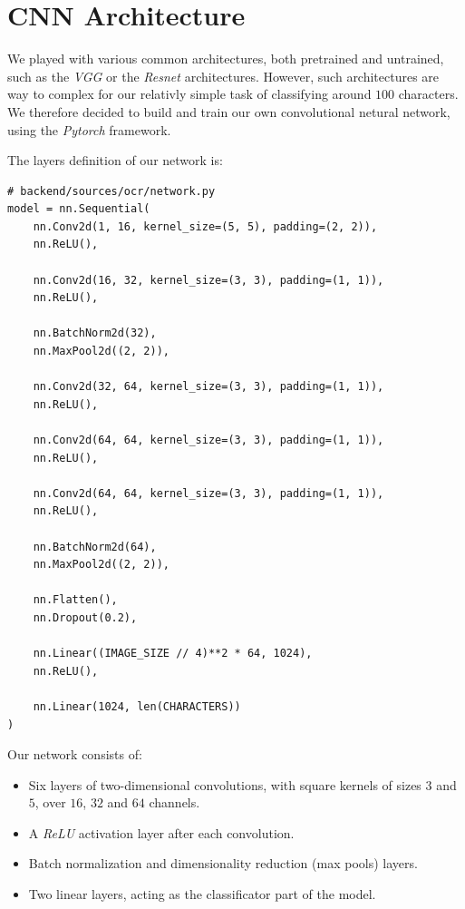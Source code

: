 \documentclass[11pt, a4paper]{report}
\begin{document}
\section{CNN Architecture}

We played with various common architectures, both pretrained and untrained, such as the \textit{VGG} \cite{VGG} or the \textit{Resnet} \cite{resnet} architectures.
However, such architectures are way to complex for our relativly simple task of classifying around $100$ characters. We therefore decided to build and train our own convolutional netural network, using the \textit{Pytorch} framework.

The layers definition of our network is:

\begin{verbatim}
# backend/sources/ocr/network.py
model = nn.Sequential(
    nn.Conv2d(1, 16, kernel_size=(5, 5), padding=(2, 2)),
    nn.ReLU(),
    
    nn.Conv2d(16, 32, kernel_size=(3, 3), padding=(1, 1)),
    nn.ReLU(),
    
    nn.BatchNorm2d(32),
    nn.MaxPool2d((2, 2)),
    
    nn.Conv2d(32, 64, kernel_size=(3, 3), padding=(1, 1)),
    nn.ReLU(),
    
    nn.Conv2d(64, 64, kernel_size=(3, 3), padding=(1, 1)),
    nn.ReLU(),
    
    nn.Conv2d(64, 64, kernel_size=(3, 3), padding=(1, 1)),
    nn.ReLU(),

    nn.BatchNorm2d(64),
    nn.MaxPool2d((2, 2)),

    nn.Flatten(),
    nn.Dropout(0.2),

    nn.Linear((IMAGE_SIZE // 4)**2 * 64, 1024),
    nn.ReLU(),

    nn.Linear(1024, len(CHARACTERS))
)
\end{verbatim}

Our network consists of:
\begin{itemize}
	\item Six layers of two-dimensional convolutions, with square kernels of sizes $3$ and $5$, over $16$, $32$ and $64$ channels.
	\item A \textit{ReLU} \cite{ReLU} activation layer after each convolution.
	\item Batch normalization and dimensionality reduction (max pools) layers.
	\item Two linear layers, acting as the classificator part of the model.
\end{itemize}
\end{document}
